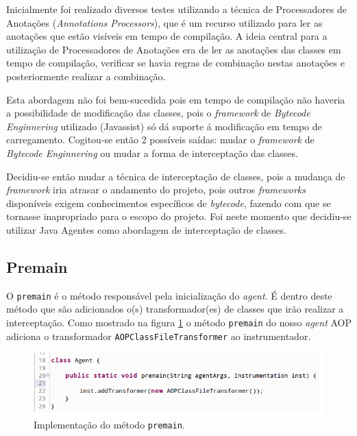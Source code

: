 \documentclass[tc,oneside]{iiufrgs}
\begin{document}
Inicialmente foi realizado diversos testes utilizando a técnica de Processadores de Anotações (\textit{Annotations Processors}), que é um recurso utilizado para ler as anotações que estão visíveis em tempo de compilação. A ideia central para a utilização de Processadores de Anotações era de ler as anotações das classes em tempo de compilação, verificar se havia regras de combinação nestas anotações e posteriormente realizar a combinação. 

Esta abordagem não foi bem-sucedida pois em tempo de compilação não haveria a possibilidade de modificação das classes, pois o \textit{framework} de \textit{Bytecode Enginnering} utilizado (Javassist) só dá suporte á modificação em tempo de carregamento. Cogitou-se então 2 possíveis saídas: mudar o \textit{framework} de \textit{Bytecode Enginnering} ou mudar a forma de interceptação das classes.

Decidiu-se então mudar a técnica de interceptação de classes, pois a mudança de \textit{framework} iria atrasar o andamento do projeto, pois outros \textit{frameworks} disponíveis exigem conhecimentos específicos de \textit{bytecode}, fazendo com que se tornasse inapropriado para o escopo do projeto. Foi neste momento que decidiu-se utilizar Java Agentes como abordagem de interceptação de classes.

\subsection{Premain}

O \texttt{premain} é o método responsável pela inicialização do \textit{agent}. É dentro deste método que são adicionados o(s) transformador(es) de classes que irão realizar a interceptação. Como mostrado na figura \ref{fig:imppremain} o método \texttt{premain} do nosso \textit{agent} AOP adiciona o transformador \texttt{AOPClassFileTransformer} ao instrumentador.

\begin{figure}[ht]
	\centering
	\includegraphics[scale=0.6]{figuras/implementacao/premain.png}
	\caption{Implementação do método \texttt{premain}.}
	\label{fig:imppremain}
\end{figure}
\end{document}
